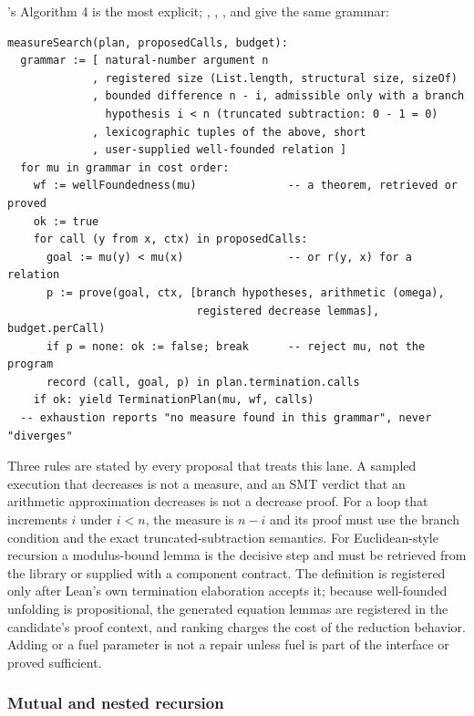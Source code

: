 's Algorithm 4 is the most explicit; , , , and  give the same grammar:
\begin{lstlisting}
measureSearch(plan, proposedCalls, budget):
  grammar := [ natural-number argument n
             , registered size (List.length, structural size, sizeOf)
             , bounded difference n - i, admissible only with a branch
               hypothesis i < n (truncated subtraction: 0 - 1 = 0)
             , lexicographic tuples of the above, short
             , user-supplied well-founded relation ]
  for mu in grammar in cost order:
    wf := wellFoundedness(mu)              -- a theorem, retrieved or proved
    ok := true
    for call (y from x, ctx) in proposedCalls:
      goal := mu(y) < mu(x)                -- or r(y, x) for a relation
      p := prove(goal, ctx, [branch hypotheses, arithmetic (omega),
                             registered decrease lemmas], budget.perCall)
      if p = none: ok := false; break      -- reject mu, not the program
      record (call, goal, p) in plan.termination.calls
    if ok: yield TerminationPlan(mu, wf, calls)
  -- exhaustion reports "no measure found in this grammar", never "diverges"
\end{lstlisting}
Three rules are stated by every proposal that treats this lane. A sampled execution that decreases is not a measure, and an SMT verdict that an arithmetic approximation decreases is not a decrease proof. For a loop that increments $i$ under $i < n$, the measure is $n - i$ and its proof must use the branch condition and the exact truncated-subtraction semantics. For Euclidean-style recursion a modulus-bound lemma is the decisive step and must be retrieved from the library or supplied with a component contract. The definition is registered only after Lean's own termination elaboration accepts it; because well-founded unfolding is propositional, the generated equation lemmas are registered in the candidate's proof context, and ranking charges the cost of the reduction behavior. Adding  or a fuel parameter is not a repair unless fuel is part of the interface or proved sufficient.

\subsubsection{Mutual and nested recursion}

